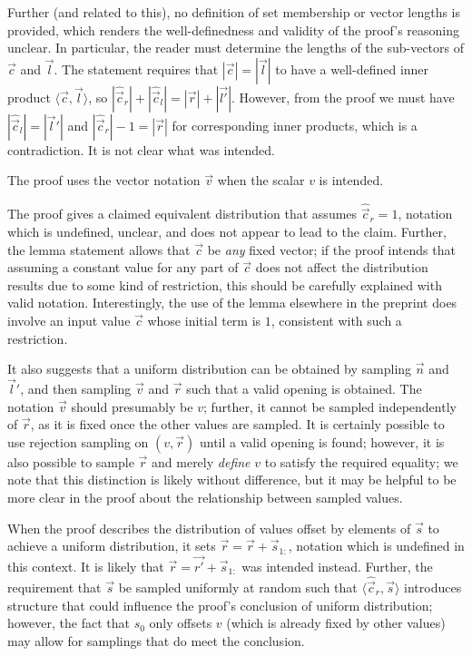 \documentclass{article}
\begin{document}
Further (and related to this), no definition of set membership or vector lengths is provided, which renders the well-definedness and validity of the proof's reasoning unclear.
In particular, the reader must determine the lengths of the sub-vectors of $\vec{c}$ and $\vec{l}$.
The statement requires that $|\vec{c}| = |\vec{l}|$ to have a well-defined inner product $\langle \vec{c}, \vec{l} \rangle$, so $|\hat{\vec{c}}_r| + |\hat{\vec{c}}_l| = |\vec{r}| + |\vec{l'}|$.
However, from the proof we must have $|\hat{\vec{c}}_l| = |\vec{l}'|$ and $|\hat{\vec{c}}_r| - 1 = |\vec{r}|$ for corresponding inner products, which is a contradiction.
It is not clear what was intended.

The proof uses the vector notation $\vec{v}$ when the scalar $v$ is intended.

The proof gives a claimed equivalent distribution that assumes $\hat{\vec{c}}_r = 1$, notation which is undefined, unclear, and does not appear to lead to the claim.
Further, the lemma statement allows that $\vec{c}$ be \textit{any} fixed vector; if the proof intends that assuming a constant value for any part of $\vec{c}$ does not affect the distribution results due to some kind of restriction, this should be carefully explained with valid notation.
Interestingly, the use of the lemma elsewhere in the preprint does involve an input value $\vec{c}$ whose initial term is $1$, consistent with such a restriction.

It also suggests that a uniform distribution can be obtained by sampling $\vec{n}$ and $\vec{l}'$, and then sampling $\vec{v}$ and $\vec{r}$ such that a valid opening is obtained.
The notation $\vec{v}$ should presumably be $v$; further, it cannot be sampled independently of $\vec{r}$, as it is fixed once the other values are sampled.
It is certainly possible to use rejection sampling on $(v, \vec{r})$ until a valid opening is found; however, it is also possible to sample $\vec{r}$ and merely \textit{define} $v$ to satisfy the required equality; we note that this distinction is likely without difference, but it may be helpful to be more clear in the proof about the relationship between sampled values.

When the proof describes the distribution of values offset by elements of $\vec{s}$ to achieve a uniform distribution, it sets $\vec{r} = \vec{r} + \vec{s}_{1:}$, notation which is undefined in this context.
It is likely that $\vec{r} = \vec{r'} + \vec{s}_{1:}$ was intended instead.
Further, the requirement that $\vec{s}$ be sampled uniformly at random such that $\langle \hat{\vec{c}}_r, \vec{s} \rangle$ introduces structure that could influence the proof's conclusion of uniform distribution; however, the fact that $s_0$ only offsets $v$ (which is already fixed by other values) may allow for samplings that do meet the conclusion.
\end{document}

